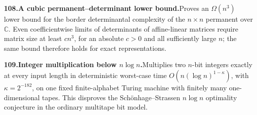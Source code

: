 \documentclass[11pt,a4paper]{article}
\begin{document}
  \par \begin{minipage}{\linewidth}
  \fontsize{10.5}{12.6}\selectfont\RaggedRight
  \hypertarget{result 108}{}
  {\bfseries\textcolor{muted}{108.}\enspace A cubic permanent--determinant lower bound.}\enspace Proves an $\Omega(n^3)$ lower bound for the border determinantal complexity of the $n\times n$ permanent over $\mathbb C$. Even coefficientwise limits of determinants of affine-linear matrices require matrix size at least $cn^3$, for an absolute $c>0$ and all sufficiently large $n$; the same bound therefore holds for exact representations.\par
  \end{minipage}\par\vspace{5pt}



  \par \begin{minipage}{\linewidth}
  \fontsize{10.5}{12.6}\selectfont\RaggedRight
  \hypertarget{result 109}{}
  {\bfseries\textcolor{muted}{109.}\enspace Integer multiplication below $n\log n$.}\enspace Multiplies two $n$-bit integers exactly at every input length in deterministic worst-case time $O(n(\log n)^{1-\kappa})$, with $\kappa=2^{-182}$, on one fixed finite-alphabet Turing machine with finitely many one-dimensional tapes. This disproves the Sch\"onhage--Strassen $n\log n$ optimality conjecture in the ordinary multitape bit model.\par
  \end{minipage}\par\vspace{5pt}
\end{document}
